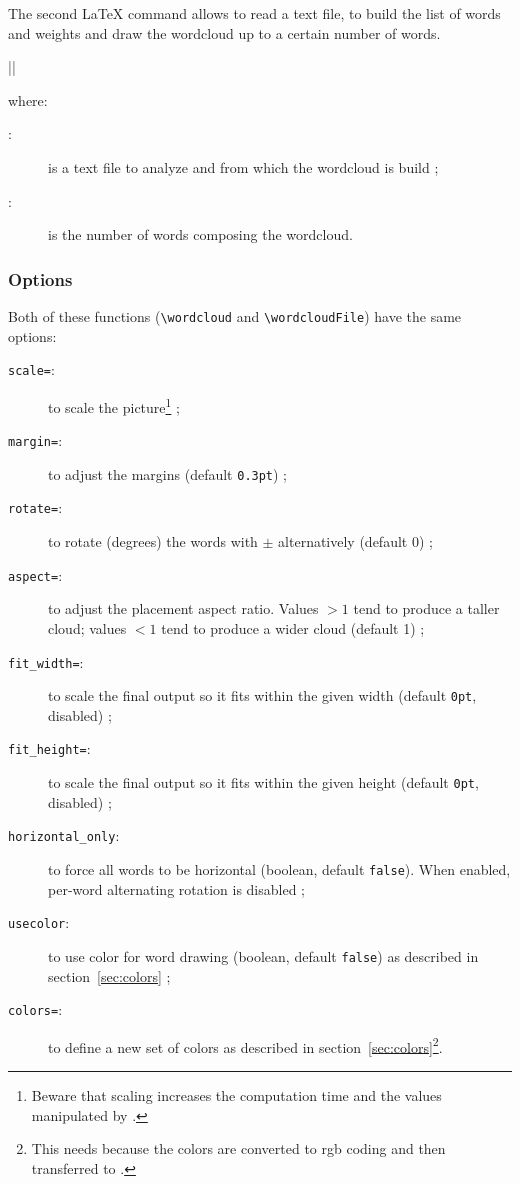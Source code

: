 \documentclass[english]{ltxdoc}
\begin{document}
The second \LaTeX{} command allows to read a text file, to build the list of
words and weights and draw the wordcloud up to a certain number of words.

\commande||\smallskip\index{\wordcloudFile@\lstinline+\wordcloudFile+}

where:
\begin{description}
  \item[:] is a text file to analyze and from which the
  wordcloud is build ;
  \item[:] is the number of words composing the wordcloud.  
\end{description}

\subsubsection{Options}

Both of these functions (\lstinline+\wordcloud+ and \lstinline+\wordcloudFile+)
have the same options:

\begin{description}
  \item[\texttt{scale=}:] to scale the picture\footnote{Beware
  that scaling increases the computation time and the values manipulated by
  .} ;
  \item[\texttt{margin=}:] to adjust the margins
  (default \lstinline+0.3pt+) ;
  \item[\texttt{rotate=}:] to rotate (degrees) the words with
  $\pm$ alternatively (default 0) ;
  \item[\texttt{aspect=}:] to adjust the placement aspect ratio.
  Values $>1$ tend to produce a taller cloud; values $<1$ tend to produce a
  wider cloud (default 1) ;
  \item[\texttt{fit\_width=}:] to scale the final output so it
  fits within the given width (default \lstinline+0pt+, disabled) ;
  \item[\texttt{fit\_height=}:] to scale the final output so it
  fits within the given height (default \lstinline+0pt+, disabled) ;
  \item[\texttt{horizontal\_only}:] to force all words to be horizontal (boolean,
  default \lstinline+false+). When enabled, per-word alternating rotation is
  disabled ;
  \item[\texttt{usecolor}:] to use color for word drawing (boolean, default
  \lstinline+false+) as described in section~\ref{sec:colors} ;
  \item[\texttt{colors=}:] to define a new
  set of colors as described in section~\ref{sec:colors}\footnote{This needs
   because the colors are converted to rgb coding and then
  transferred to .}.
\end{description}
  
\end{document}
